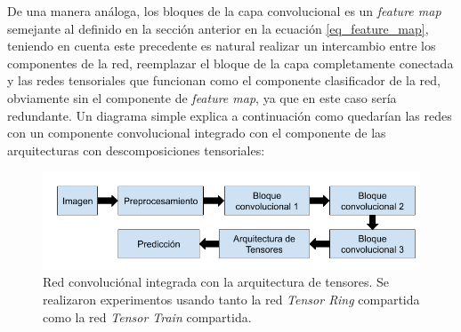 \documentclass[spanish]{article}
\theoremstyle{definition}
\theoremstyle{remark}
\numberwithin{equation}{section}
\numberwithin{equation}{section} %
\begin{document}
De una manera análoga, los bloques de la capa convolucional es un \textit{feature map} semejante al definido en la sección anterior en la ecuación \eqref{eq_feature_map}, teniendo en cuenta este precedente es natural realizar un intercambio entre los componentes de la red, reemplazar el bloque de la capa completamente conectada y las redes tensoriales que funcionan como el componente clasificador de la red, obviamente sin el componente de \textit{feature map}, ya que en este caso sería redundante. Un diagrama simple explica a continuación como quedarían las redes con un componente convolucional integrado con el componente de las arquitecturas con descomposiciones tensoriales:    
\begin{figure}[H]
\centering
\includegraphics[width=15cm]{img/cnn_tensores.png}
\caption[Red convoluciónal integrada con la arquitectura de tensores.]{\footnotesize{Red convoluciónal integrada con la arquitectura de tensores. Se realizaron experimentos usando tanto la red \textit{Tensor Ring} compartida como la red  \textit{Tensor Train} compartida. }}
\label{fig:convolutional_tensor}
\end{figure}
\par
\end{document}
